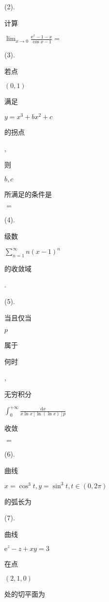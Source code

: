 \documentclass[10pt]{article}
\begin{document}
(2). \begin{CJK}{UTF8}{mj}计算\end{CJK} $\lim _{x \rightarrow 0} \frac{\mathrm{e}^{x}-1-x}{\cos x-1}=$

(3). \begin{CJK}{UTF8}{mj}若点\end{CJK} $(0,1)$ \begin{CJK}{UTF8}{mj}满足\end{CJK} $y=x^{3}+b x^{2}+c$ \begin{CJK}{UTF8}{mj}的拐点\end{CJK}, \begin{CJK}{UTF8}{mj}则\end{CJK} $b, c$ \begin{CJK}{UTF8}{mj}所满足的条件是\end{CJK} $=$

(4). \begin{CJK}{UTF8}{mj}级数\end{CJK} $\sum_{n=1}^{\infty} n(x-1)^{n}$ \begin{CJK}{UTF8}{mj}的收敛域\end{CJK}.

(5). \begin{CJK}{UTF8}{mj}当且仅当\end{CJK} $p$ \begin{CJK}{UTF8}{mj}属于\end{CJK} \begin{CJK}{UTF8}{mj}何时\end{CJK}, \begin{CJK}{UTF8}{mj}无穷积分\end{CJK} $\int_{0}^{+\infty} \frac{\mathrm{d} x}{x \ln x[\ln (\ln x)] p}$ \begin{CJK}{UTF8}{mj}收敛\end{CJK} $=$

(6). \begin{CJK}{UTF8}{mj}曲线\end{CJK} $x=\cos ^{3} t, y=\sin ^{3} t, t \in(0,2 \pi)$ \begin{CJK}{UTF8}{mj}的弧长为\end{CJK}

(7). \begin{CJK}{UTF8}{mj}曲线\end{CJK} $\mathrm{e}^{z}-z+x y=3$ \begin{CJK}{UTF8}{mj}在点\end{CJK} $(2,1,0)$ \begin{CJK}{UTF8}{mj}处的切平面为\end{CJK}
\end{document}

